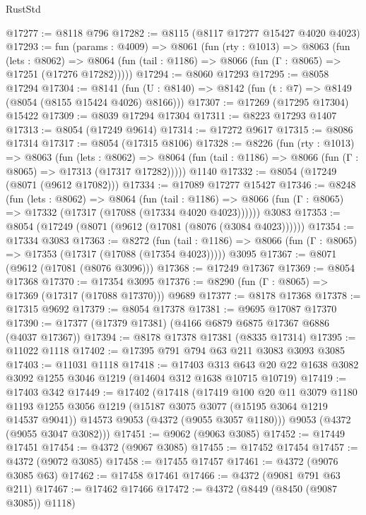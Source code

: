 \begin{lexlean}{RustStd}
\begin{coremodule}
@17277 := @8118 @796
@17282 := @8115 (@8117 @17277 @15427 @4020 @4023)
@17293 := fun (params : @4009) =>
  @8061
    (fun (rty : @1013) =>
    @8063
      (fun (lets : @8062) =>
      @8064 (fun (tail : @1186) => @8066 (fun (Γ : @8065) => @17251 (@17276 @17282)))))
@17294 := @8060 @17293
@17295 := @8058 @17294
@17304 := @8141
    (fun (U : @8140) => @8142 (fun (t : @7) => @8149 (@8054 (@8155 @15424 @4026) @8166)))
@17307 := @17269 (@17295 @17304) @15422
@17309 := @8039 @17294 @17304
@17311 := @8223 @17293 @1407
@17313 := @8054 (@17249 @9614)
@17314 := @17272 @9617
@17315 := @8086 @17314
@17317 := @8054 (@17315 @8106)
@17328 := @8226
    (fun (rty : @1013) =>
    @8063
      (fun (lets : @8062) =>
      @8064 (fun (tail : @1186) => @8066 (fun (Γ : @8065) => @17313 (@17317 @17282)))))
    @1140
@17332 := @8054 (@17249 (@8071 (@9612 @17082)))
@17334 := @17089 @17277 @15427
@17346 := @8248
    (fun (lets : @8062) =>
    @8064
      (fun (tail : @1186) =>
      @8066 (fun (Γ : @8065) => @17332 (@17317 (@17088 (@17334 @4020 @4023))))))
    @3083
@17353 := @8054 (@17249 (@8071 (@9612 (@17081 (@8076 (@3084 @4023))))))
@17354 := @17334 @3083
@17363 := @8272
    (fun (tail : @1186) => @8066 (fun (Γ : @8065) => @17353 (@17317 (@17088 (@17354 @4023)))))
    @3095
@17367 := @8071 (@9612 (@17081 (@8076 @3096)))
@17368 := @17249 @17367
@17369 := @8054 @17368
@17370 := @17354 @3095
@17376 := @8290 (fun (Γ : @8065) => @17369 (@17317 (@17088 @17370))) @9689
@17377 := @8178 @17368
@17378 := @17315 @9692
@17379 := @8054 @17378
@17381 := @9695 @17087 @17370
@17390 := @17377 (@17379 @17381) (@4166 @6879 @6875 @17367 @6886 (@4037 @17367))
@17394 := @8178 @17378 @17381 (@8335 @17314)
@17395 := @11022 @1118
@17402 := @17395 @791 @794 @63 @211 @3083 @3093 @3085
@17403 := @11031 @1118
@17418 := @17403
    @313
    @643
    @20
    @22
    @1638
    @3082
    @3092
    @1255
    @3046
    @1219
    (@14604 @312 @1638 @10715 @10719)
@17419 := @17403 @342
@17449 := @17402
    (@17418
      (@17419
        @100
        @20
        @11
        @3079
        @1180
        @1193
        @1255
        @3056
        @1219
        (@15187 @3075 @3077 (@15195 @3064 @1219 @14537 @9041))
        @14573
        @9053
        (@4372 (@9055 @3057 @1180)))
      @9053
      (@4372 (@9055 @3047 @3082)))
@17451 := @9062 (@9063 @3085)
@17452 := @17449 @17451
@17454 := @4372 (@9067 @3085)
@17455 := @17452 @17454
@17457 := @4372 (@9072 @3085)
@17458 := @17455 @17457
@17461 := @4372 (@9076 @3085 @63)
@17462 := @17458 @17461
@17466 := @4372 (@9081 @791 @63 @211)
@17467 := @17462 @17466
@17472 := @4372 (@8449 (@8450 (@9087 @3085)) @1118)

\end{coremodule}
\end{lexlean}
